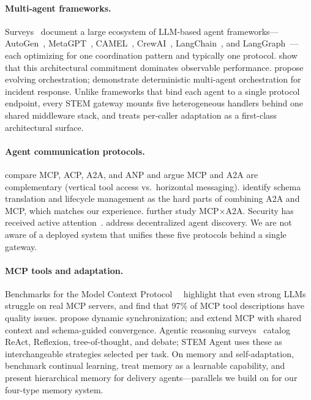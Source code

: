 \documentclass[11pt]{article}
\begin{document}
\paragraph{Multi-agent frameworks.}
Surveys~\citep{tran2025multiagent, ferrag2025agents} document a large ecosystem of LLM-based agent frameworks---AutoGen~\citep{wu2023autogen}, MetaGPT~\citep{hong2023metagpt}, CAMEL~\citep{li2023camel}, CrewAI~\citep{crewai2023}, LangChain~\citep{chase2022langchain}, and LangGraph~\citep{langgraph2024}---each optimizing for one coordination pattern and typically one protocol. \citet{orogat2026mafbench} show that this architectural commitment dominates observable performance. \citet{dang2025evolving} propose evolving orchestration; \citet{drammeh2025orchestration} demonstrate deterministic multi-agent orchestration for incident response. Unlike frameworks that bind each agent to a single protocol endpoint, every STEM gateway mounts five heterogeneous handlers behind one shared middleware stack, and treats per-caller adaptation as a first-class architectural surface.

\paragraph{Agent communication protocols.}
\citet{ehtesham2025survey} compare MCP, ACP, A2A, and ANP and argue MCP and A2A are complementary (vertical tool access vs.\ horizontal messaging). \citet{li2025gluetoprotocols} identify schema translation and lifecycle management as the hard parts of combining A2A and MCP, which matches our experience. \citet{jeong2025mcpa2a} further study MCP$\times$A2A. Security has received active attention~\citep{habler2025a2a, anbiaee2026security, sarkar2025mcpsurvey}. \citet{chang2025anp} address decentralized agent discovery. We are not aware of a deployed system that unifies these five protocols behind a single gateway.

\paragraph{MCP tools and adaptation.}
Benchmarks for the Model Context Protocol~\citep{anthropic2024mcp}~\citep{luo2025mcpuniverse, fan2025mcptoolbench} highlight that even strong LLMs struggle on real MCP servers, and \citet{hasan2026mcpsmells} find that 97\% of MCP tool descriptions have quality issues. \citet{lumer2025scalemcp} propose dynamic synchronization; \citet{jayanti2026enhancing} and \citet{schlapbach2026convergence} extend MCP with shared context and schema-guided convergence. Agentic reasoning surveys~\citep{wei2026agentic, alomrani2025reasoning, li2025budget} catalog ReAct, Reflexion, tree-of-thought, and debate; STEM Agent uses these as interchangeable strategies selected per task. On memory and self-adaptation, \citet{ai2025memorybench} benchmark continual learning, \citet{gallego2026memoryastool} treat memory as a learnable capability, and \citet{yadav2026synapse} present hierarchical memory for delivery agents---parallels we build on for our four-type memory system.
\end{document}

